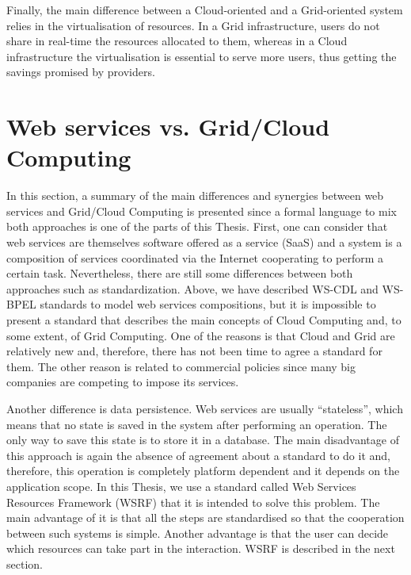 Finally, the main difference between a Cloud-oriented and a Grid-oriented system relies in the virtualisation of resources. 
In a Grid infrastructure, users do not share in real-time the resources allocated to them, 
whereas in a Cloud infrastructure the virtualisation is essential to serve more users,
thus getting the savings promised by providers.

\section{Web services vs. Grid/Cloud Computing}

In this section, a summary of the main differences and synergies between web services and
Grid/Cloud Computing is presented since a formal language to mix both approaches is one of the parts of this
Thesis. First, one can consider that web services are themselves software offered as a service (SaaS)
and a system is a composition of services coordinated via the Internet
cooperating to perform a certain task. Nevertheless, 
there are still some differences between both approaches such as standardization. Above,
we have described WS-CDL and WS-BPEL standards to model web services compositions, but
it is impossible to present a standard that describes the main concepts of Cloud Computing and, to some
extent, of Grid Computing. One of the reasons is that Cloud and Grid are relatively new and, therefore,
there has not been time to agree a standard for them. The other reason is related to commercial policies since
many big companies are competing to impose its services.  

Another difference is data persistence. Web services are usually ``stateless'', which means that
no state is saved in the system after performing an operation. The only way to save
this state is to store it in a database. The main disadvantage of this approach is again the absence of 
agreement about a standard to do it and, therefore, this operation is completely platform dependent 
and it depends on the application scope. 
In this Thesis, we use a standard called Web Services Resources Framework (WSRF) that it is intended to solve this problem. 
The main advantage of it is that all the steps are standardised so that the cooperation 
between such systems is simple. Another advantage is that the user can decide which 
resources can take part in the interaction. WSRF is described in the next section. 


